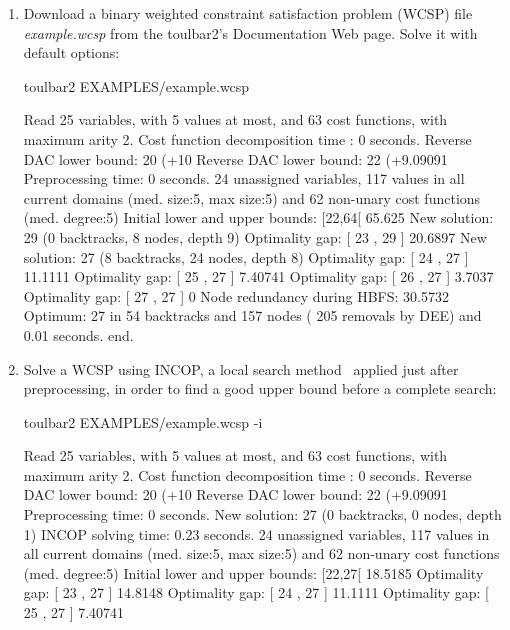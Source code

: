 \begin{enumerate}
\item Download a binary weighted constraint satisfaction problem (WCSP) file {\em example.wcsp} from the toulbar2's Documentation Web page. Solve it with default options:
\begin{DoxyCode}
	toulbar2 EXAMPLES/example.wcsp
\end{DoxyCode}
{\scriptsize
\begin{DoxyCode}
Read 25 variables, with 5 values at most, and 63 cost functions, with maximum arity 2.
Cost function decomposition time : 0 seconds.
Reverse DAC lower bound: 20 (+10%
Reverse DAC lower bound: 22 (+9.09091%
Preprocessing time: 0 seconds.
24 unassigned variables, 117 values in all current domains (med. size:5, max size:5) and 62 non-unary cost functions (med. degree:5)
Initial lower and upper bounds: [22,64[ 65.625%
New solution: 29 (0 backtracks, 8 nodes, depth 9)
Optimality gap: [ 23 , 29 ] 20.6897 %
New solution: 27 (8 backtracks, 24 nodes, depth 8)
Optimality gap: [ 24 , 27 ] 11.1111 %
Optimality gap: [ 25 , 27 ] 7.40741 %
Optimality gap: [ 26 , 27 ] 3.7037 %
Optimality gap: [ 27 , 27 ] 0 %
Node redundancy during HBFS: 30.5732 %
Optimum: 27 in 54 backtracks and 157 nodes ( 205 removals by DEE) and 0.01 seconds.
end.
\end{DoxyCode}}
\item Solve a WCSP using INCOP, a local search method~\cite{idwalk:cp04} applied just after preprocessing, in order to find a good upper bound before a complete search:
\begin{DoxyCode}
	toulbar2 EXAMPLES/example.wcsp -i
\end{DoxyCode}
{\scriptsize
\begin{DoxyCode}
Read 25 variables, with 5 values at most, and 63 cost functions, with maximum arity 2.
Cost function decomposition time : 0 seconds.
Reverse DAC lower bound: 20 (+10%
Reverse DAC lower bound: 22 (+9.09091%
Preprocessing time: 0 seconds.
New solution: 27 (0 backtracks, 0 nodes, depth 1)
INCOP solving time: 0.23 seconds.
24 unassigned variables, 117 values in all current domains (med. size:5, max size:5) and 62 non-unary cost functions (med. degree:5)
Initial lower and upper bounds: [22,27[ 18.5185%
Optimality gap: [ 23 , 27 ] 14.8148 %
Optimality gap: [ 24 , 27 ] 11.1111 %
Optimality gap: [ 25 , 27 ] 7.40741 %

\end{DoxyCode}}
\end{enumerate}
